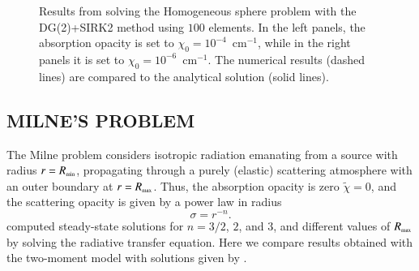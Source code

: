 \documentclass[11pt,letterpaper,twoside,english,final]{article}
\begin{document}
\begin{figure}[h]
\begin{tabular}{cc}
  \end{tabular}
  \vspace{-0.1in}
  \flushleft\caption[Results from solving the Homogeneous sphere problem with the DG(2)+SIRK2 method using $100$ elements.]{Results from solving the Homogeneous sphere problem with the DG(2)+SIRK2 method using $100$ elements.  \textmd{In the left panels, the absorption opacity is set to $\chi_{0}=10^{-4}$~cm$^{-1}$, while in the right panels it is set to $\chi_{0}=10^{-6}$~cm$^{-1}$.  The numerical results (dashed lines) are compared to the analytical solution (solid lines).}}
  \label{fig:homogeneousSphere1D}
\end{figure}

\subsection{MILNE'S PROBLEM}

The Milne problem \citep[see, e.g.,][for details]{hummerRybicki_1971} considers isotropic radiation emanating from a source with radius $r=R_{\mbox{\tiny min}}$, propagating through a purely (elastic) scattering atmosphere with an outer boundary at $r=R_{\mbox{\tiny max}}$.  
Thus, the absorption opacity is zero $\tilde{\chi}=0$, and the scattering opacity is given by a power law in radius
\begin{equation}
  \sigma=r^{-n}.  
  \label{eq:opacityMilne}
\end{equation}
\citet{hummerRybicki_1971} computed steady-state solutions for $n=3/2$, $2$, and $3$, and different values of $R_{\mbox{\tiny max}}$ by solving the radiative transfer equation.  
Here we compare results obtained with the two-moment model with solutions given by \citet{hummerRybicki_1971}.  
\end{document}
